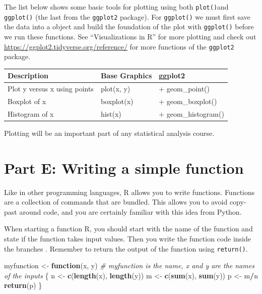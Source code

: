 \documentclass[]{article}
\newenvironment{Shaded}{\begin{snugshade}}{\end{snugshade}}
\newcommand{\KeywordTok}[1]{\textcolor[rgb]{0.13,0.29,0.53}{\textbf{#1}}}
\newcommand{\StringTok}[1]{\textcolor[rgb]{0.31,0.60,0.02}{#1}}
\newcommand{\CommentTok}[1]{\textcolor[rgb]{0.56,0.35,0.01}{\textit{#1}}}
\newcommand{\ControlFlowTok}[1]{\textcolor[rgb]{0.13,0.29,0.53}{\textbf{#1}}}
\newcommand{\OperatorTok}[1]{\textcolor[rgb]{0.81,0.36,0.00}{\textbf{#1}}}
\newcommand{\NormalTok}[1]{#1}
\begin{document}
The list below shows some basic tools for plotting using both
\texttt{plot()}and \texttt{ggplot()} (the last from the \texttt{ggplot2}
package). For \texttt{ggplot()} we must first save the data into a
object and build the foundation of the plot with \texttt{ggplot()}
before we run these functions. See ``Visualizations in R'' for more
plotting and check out \url{https://ggplot2.tidyverse.org/reference/}
for more functions of the \texttt{ggplot2} package.

\begin{longtable}[]{@{}lll@{}}
\toprule
Description & Base Graphics & ggplot2\tabularnewline
\midrule
\endhead
Plot y versus x using points & plot(x, y) & +
geom\_point()\tabularnewline
Boxplot of x & boxplot(x) & + geom\_boxplot()\tabularnewline
Histogram of x & hist(x) & + geom\_histogram()\tabularnewline
\bottomrule
\end{longtable}

Plotting will be an important part of any statistical analysis course.

\section{Part E: Writing a simple
function}\label{part-e-writing-a-simple-function}

Like in other programming languages, R allows you to write functions.
Functions are a collection of commands that are bundled. This allows you
to avoid copy-past around code, and you are certainly familiar with this
idea from Python.

When starting a function R, you should start with the name of the
function and state if the function takes input values. Then you write
the function code inside the branches \({}\). Remember to return the
output of the function using \texttt{return()}.

\begin{Shaded}
\begin{Highlighting}[]
\NormalTok{myfunction <-}\StringTok{ }\ControlFlowTok{function}\NormalTok{(x, y) }\CommentTok{# myfunction is the name, x and y are the names of the inputs}
\NormalTok{\{}
\NormalTok{    n <-}\StringTok{ }\KeywordTok{c}\NormalTok{(}\KeywordTok{length}\NormalTok{(x), }\KeywordTok{length}\NormalTok{(y))}
\NormalTok{    m <-}\StringTok{ }\KeywordTok{c}\NormalTok{(}\KeywordTok{sum}\NormalTok{(x), }\KeywordTok{sum}\NormalTok{(y))}
\NormalTok{    p <-}\StringTok{ }\NormalTok{m}\OperatorTok{/}\NormalTok{n}
    \KeywordTok{return}\NormalTok{(p)}
\NormalTok{\}}
\end{Highlighting}
\end{Shaded}
\end{document}
